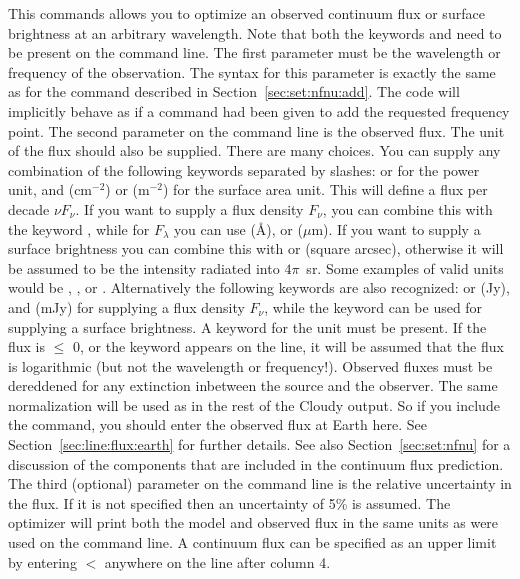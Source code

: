 This commands allows you to optimize an observed continuum flux or surface brightness at an
arbitrary wavelength. Note that both the keywords  and
 need to be present on the command line. The first parameter
must be the wavelength or frequency of the observation. The syntax for this
parameter is exactly the same as for the  command
described in Section~\ref{sec:set:nfnu:add}. The code will implicitly behave
as if a  command had been given to add the requested
frequency point. The second parameter
on the command line is the observed flux. The unit of the flux should also
be supplied. There are many choices. You can supply any combination of the
following keywords separated by slashes:  or 
for the power unit, and  (cm$^{-2}$) or 
(m$^{-2}$) for the surface area unit. This will define a flux per decade $\nu
F_\nu$. If you want to supply a flux density $F_\nu$, you can combine this
with the keyword , while for $F_\lambda$ you can use 
(\AA),  or  ($\mu$m). If you want to supply a surface
brightness you can combine this with  or  (square arcsec),
otherwise it will be assumed to be the intensity radiated into $4\pi$~sr.
Some examples of valid units would be ,
, or . Alternatively the
following keywords are also recognized:  or
 (Jy), and  (mJy) for supplying a flux density $F_\nu$,
while the keyword  can be used for supplying a surface
brightness. A keyword for the unit must be present.
If the flux is $\leq$ 0, or the keyword
 appears on the line, it will be assumed that the flux is
logarithmic (but not the wavelength or frequency!). Observed fluxes must be
dereddened for any extinction inbetween the source and the observer. The same
normalization will be used as in the rest of the Cloudy output. So if you
include the  command, you should enter the
observed flux at Earth here. See Section~\ref{sec:line:flux:earth} for further
details. See also Section~\ref{sec:set:nfnu} for a discussion of the
components that are included in the continuum flux prediction. The third
(optional) parameter on the command line is the relative uncertainty in the
flux. If it is not specified then an uncertainty of 5\% is assumed. The optimizer
will print both the model and observed flux in the same units as were used on the
command line.
A continuum flux can be specified as an upper limit by entering
$<$ anywhere on the line after column 4.

